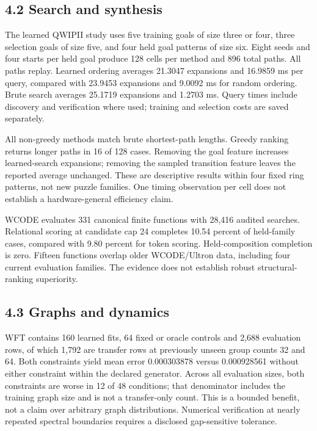 \documentclass[
  11pt,
  a4paper,
]{article}
\begin{document}
\subsection{4.2 Search and synthesis}\label{search-and-synthesis}

The learned QWIPII study uses five training goals of size three or four,
three selection goals of size five, and four held goal patterns of size
six. Eight seeds and four starts per held goal produce 128 cells per
method and 896 total paths. All paths replay. Learned ordering averages
21.3047 expansions and 16.9859 ms per query, compared with 23.9453
expansions and 9.0092 ms for random ordering. Brute search averages
25.1719 expansions and 1.2703 ms. Query times include discovery and
verification where used; training and selection costs are saved
separately.

All non-greedy methods match brute shortest-path lengths. Greedy ranking
returns longer paths in 16 of 128 cases. Removing the goal feature
increases learned-search expansions; removing the sampled transition
feature leaves the reported average unchanged. These are descriptive
results within four fixed ring patterns, not new puzzle families. One
timing observation per cell does not establish a hardware-general
efficiency claim.

WCODE evaluates 331 canonical finite functions with 28,416 audited
searches. Relational scoring at candidate cap 24 completes 10.54 percent
of held-family cases, compared with 9.80 percent for token scoring.
Held-composition completion is zero. Fifteen functions overlap older
WCODE/Ultron data, including four current evaluation families. The
evidence does not establish robust structural-ranking superiority.

\subsection{4.3 Graphs and dynamics}\label{graphs-and-dynamics}

WFT contains 160 learned fits, 64 fixed or oracle controls and 2,688
evaluation rows, of which 1,792 are transfer rows at previously unseen
group counts 32 and 64. Both constraints yield mean error 0.000303878
versus 0.000928561 without either constraint within the declared
generator. Across all evaluation sizes, both constraints are worse in 12
of 48 conditions; that denominator includes the training graph size and
is not a transfer-only count. This is a bounded benefit, not a claim
over arbitrary graph distributions. Numerical verification at nearly
repeated spectral boundaries requires a disclosed gap-sensitive
tolerance.
\end{document}
